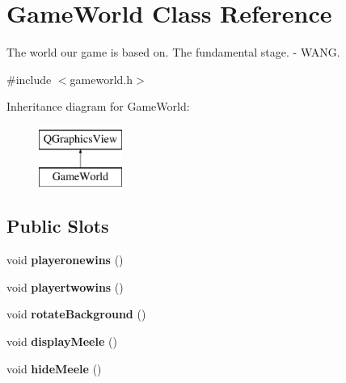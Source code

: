 \hypertarget{class_game_world}{}\section{Game\+World Class Reference}
\label{class_game_world}


The world our game is based on. The fundamental stage. -\/ W\+A\+NG.  




{\ttfamily \#include $<$gameworld.\+h$>$}

Inheritance diagram for Game\+World\+:\begin{figure}[H]
\begin{center}
\leavevmode
\includegraphics[height=2.000000cm]{class_game_world}
\end{center}
\end{figure}
\subsection*{Public Slots}
\begin{DoxyCompactItemize}
\item 
void {\bfseries playeronewins} ()\hypertarget{class_game_world_ada24b43c2a2c6d8147f2054a1e4a71c0}{}\label{class_game_world_ada24b43c2a2c6d8147f2054a1e4a71c0}

\item 
void {\bfseries playertwowins} ()\hypertarget{class_game_world_a6a0c32cf4eea04374ea6c4ec75ed3737}{}\label{class_game_world_a6a0c32cf4eea04374ea6c4ec75ed3737}

\item 
void {\bfseries rotate\+Background} ()\hypertarget{class_game_world_a4b17ac101198095db71b34cfd87b97b2}{}\label{class_game_world_a4b17ac101198095db71b34cfd87b97b2}

\item 
void {\bfseries display\+Meele} ()\hypertarget{class_game_world_a0b7431a3b73fbbf9a82fa1dc4bf66044}{}\label{class_game_world_a0b7431a3b73fbbf9a82fa1dc4bf66044}

\item 
void {\bfseries hide\+Meele} ()\hypertarget{class_game_world_a4933e2019efbb8f0eaab67c207ed88ae}{}\label{class_game_world_a4933e2019efbb8f0eaab67c207ed88ae}

\end{DoxyCompactItemize}
